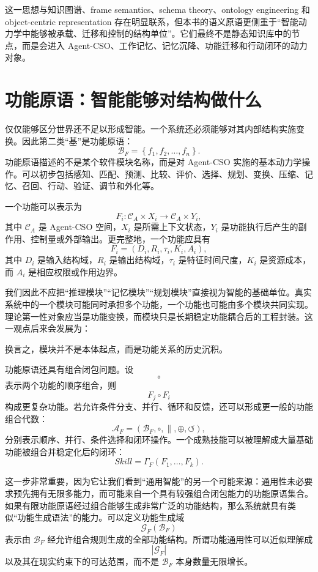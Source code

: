 这一思想与知识图谱、frame semantics、schema theory、ontology engineering 和 object-centric representation 存在明显联系，但本书的语义原语更侧重于“智能动力学中能够被承载、迁移和控制的结构单位”。它们最终不是静态知识库中的节点，而是会进入 Agent-CSO、工作记忆、记忆沉降、功能迁移和行动闭环的动力对象。

\section{功能原语：智能能够对结构做什么}

仅仅能够区分世界还不足以形成智能。一个系统还必须能够对其内部结构实施变换。因此第二类“基”是功能原语：
\[
\boxed{
\mathcal B_F
=
\left\{
f_1,f_2,\ldots,f_n
\right\}.
}
\]
功能原语描述的不是某个软件模块名称，而是对 Agent-CSO 实施的基本动力学操作。可以初步包括感知、匹配、预测、比较、评价、选择、规划、变换、压缩、记忆、召回、行动、验证、调节和外化等。

一个功能可以表示为
\[
F_i:
\mathcal C_A
\times
X_i
\rightarrow
\mathcal C_A
\times
Y_i,
\]
其中 $\mathcal C_A$ 是 Agent-CSO 空间，$X_i$ 是所需上下文状态，$Y_i$ 是功能执行后产生的副作用、控制量或外部输出。更完整地，一个功能应具有
\[
F_i
=
\left(
D_i,
R_i,
\tau_i,
K_i,
A_i
\right),
\]
其中 $D_i$ 是输入结构域，$R_i$ 是输出结构域，$\tau_i$ 是特征时间尺度，$K_i$ 是资源成本，而 $A_i$ 是相应权限或作用边界。

我们因此不应把“推理模块”“记忆模块”“规划模块”直接视为智能的基础单位。真实系统中的一个模块可能同时承担多个功能，一个功能也可能由多个模块共同实现。理论第一性对象应当是功能变换，而模块只是长期稳定功能耦合后的工程封装。这一观点后来会发展为：
\begin{statementbox}
\centering
{}
\end{statementbox}
换言之，模块并不是本体起点，而是功能关系的历史沉积。

功能原语还具有组合闭包问题。设
\[
\circ
\]
表示两个功能的顺序组合，则
\[
F_j\circ F_i
\]
构成更复杂功能。若允许条件分支、并行、循环和反馈，还可以形成更一般的功能组合代数：
\[
\mathcal A_F
=
\left(
\mathcal B_F,
\circ,
\parallel,
\oplus,
\circlearrowleft
\right),
\]
分别表示顺序、并行、条件选择和闭环操作。一个成熟技能可以被理解成大量基础功能被组合并稳定化后的闭环：
\[
Skill
=
\Gamma_F(F_1,\ldots,F_k).
\]

这一步非常重要，因为它让我们看到“通用智能”的另一个可能来源：通用性未必要求预先拥有无限多能力，而可能来自一个具有较强组合闭包能力的功能原语集合。如果有限功能原语经过组合能够生成非常广泛的功能结构，那么系统就具有类似“功能生成语法”的能力。可以定义功能生成域
\[
\mathcal G_F(\mathcal B_F)
\]
表示由 $\mathcal B_F$ 经允许组合规则生成的全部功能结构。所谓功能通用性可以近似理解成
\[
|\mathcal G_F|
\]
以及其在现实约束下的可达范围，而不是 $\mathcal B_F$ 本身数量无限增长。


